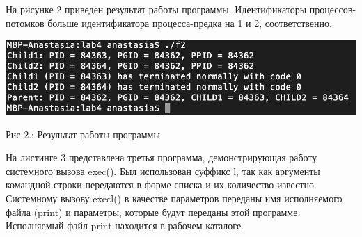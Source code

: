 \documentclass[12pt]{report}
\begin{document}
На рисунке 2 приведен результат работы программы. Идентификаторы процессов-потомков больше идентификатора процесса-предка на 1 и 2, соответственно.
\begin{center}
		\includegraphics[scale=0.8]{pics/proc2.png}
		
			Рис 2.:  Результат работы программы
\end{center}

На листинге 3 представлена третья программа, демонстрирующая работу системного вызова exec(). Был использован суффикс l, так как аргументы командной строки передаются в форме списка и их количество известно. Системному вызову execl() в качестве параметров переданы имя исполняемого файла (print) и параметры, которые будут переданы этой программе. Исполняемый файл print находится в рабочем каталоге.
\end{document}
